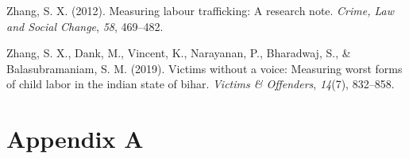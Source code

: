 \documentclass[
  12pt,
]{article}
\newlength{\cslhangindent}
\newenvironment{CSLReferences}[2] %
 {\begin{list}{}{%
  \setlength{\itemindent}{0pt}
  \setlength{\leftmargin}{0pt}
  \setlength{\parsep}{0pt}
  \ifodd #1
   \setlength{\leftmargin}{\cslhangindent}
   \setlength{\itemindent}{-1\cslhangindent}
  \fi
  \setlength{\itemsep}{#2\baselineskip}}}
 {\end{list}}
\theoremstyle{plain}
\theoremstyle{definition}
\begin{document}
\begin{CSLReferences}{1}{0}
Zhang, S. X. (2012). Measuring labour trafficking: A research note.
\emph{Crime, Law and Social Change}, \emph{58}, 469--482.

Zhang, S. X., Dank, M., Vincent, K., Narayanan, P., Bharadwaj, S., \&
Balasubramaniam, S. M. (2019). Victims without a voice: Measuring worst
forms of child labor in the indian state of bihar. \emph{Victims \&
Offenders}, \emph{14}(7), 832--858.

\end{CSLReferences}

\newpage

\appendix

\section{Appendix A}\label{appendix-a}
\end{document}
